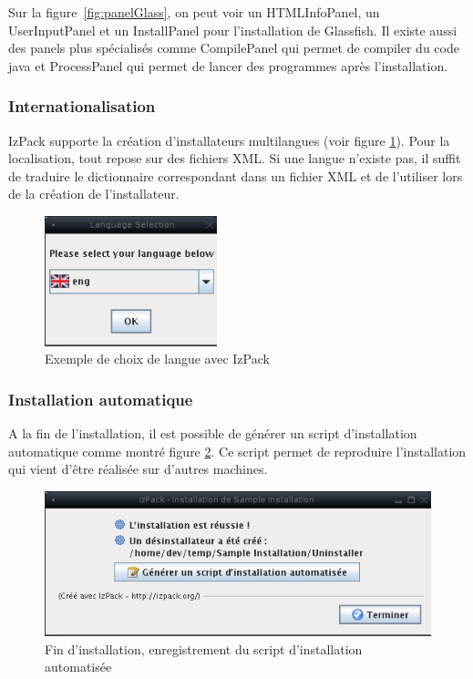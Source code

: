 Sur la figure~\ref{fig:panelGlass}, on peut voir un HTMLInfoPanel, un UserInputPanel et un InstallPanel pour l'installation de Glassfish.
Il existe aussi des panels plus spécialisés comme CompilePanel qui permet de compiler du code java et ProcessPanel qui permet de lancer des programmes après l'installation.

\subsubsection{Internationalisation}
IzPack supporte la création d'installateurs multilangues (voir figure \ref{fig:LangChoice}).
Pour la localisation, tout repose sur des fichiers XML.
Si une langue n'existe pas, il suffit de traduire le dictionnaire correspondant dans un fichier XML et de l'utiliser lors de la création de l'installateur.
\begin{figure}[H]
	\centering
	\includegraphics[width=5cm]{../image/LangChoice.png}
	\caption{Exemple de choix de langue avec IzPack}
	\label{fig:LangChoice}
\end{figure}

\subsubsection{Installation automatique}
A la fin de l'installation, il est possible de générer un script d'installation automatique comme montré figure \ref{fig:SaveInstallXML}.
Ce script permet de reproduire l'installation qui vient d'être réalisée sur d'autres machines.
\begin{figure}[H]
	\centering
	\includegraphics[width=12cm]{../image/SaveInstallXML.png}
	\caption{Fin d'installation, enregistrement du script d'installation automatisée}
	\label{fig:SaveInstallXML}
\end{figure}

